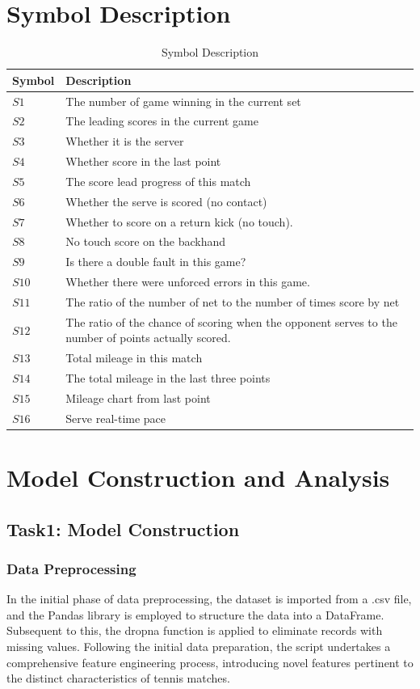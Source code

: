\documentclass{article}
\begin{document}
\section{Symbol Description}
\begin{table}[H]
\centering
\begin{tabular}{|>{\centering\arraybackslash}m{2.5cm}|p{}|}
\hline
\textbf{Symbol} & \textbf{Description} \\ \hline
$S1$ & The number of game winning in the current set \\ \hline
$S2$ & The leading scores in the current game \\ \hline
$S3$ & Whether it is the server \\ \hline
$S4$ & Whether score in the last point \\ \hline
$S5$ & The score lead progress of this match\\ \hline
$S6$ & Whether the serve is scored (no contact) \\ \hline
$S7$ & Whether to score on a return kick (no touch). \\ \hline
$S8$ & No touch score on the backhand \\ \hline
$S9$ & Is there a double fault in this game? \\ \hline
$S10$ & Whether there were unforced errors in this game. \\ \hline
$S11$ & The ratio of the number of net to the number of times score by net \\ \hline
$S12$ & The ratio of the chance of scoring when the opponent serves to the number of points actually scored. \\ \hline
$S13$ & Total mileage in this match \\ \hline
$S14$ & The total mileage in the last three points \\ \hline
$S15$ & Mileage chart from last point \\ \hline
$S16$ & Serve real-time pace \\ \hline
\end{tabular}
\caption{Symbol Description}
\end{table}
\section{Model Construction and Analysis}
\subsection{Task1: Model Construction}
\subsubsection{Data Preprocessing}
In the initial phase of data preprocessing, the dataset is imported from a .csv file, and the Pandas library is employed to structure the data into a DataFrame. Subsequent to this, the dropna function is applied to eliminate records with missing values. Following the initial data preparation, the script undertakes a comprehensive feature engineering process, introducing novel features pertinent to the distinct characteristics of tennis matches.
\end{document}
